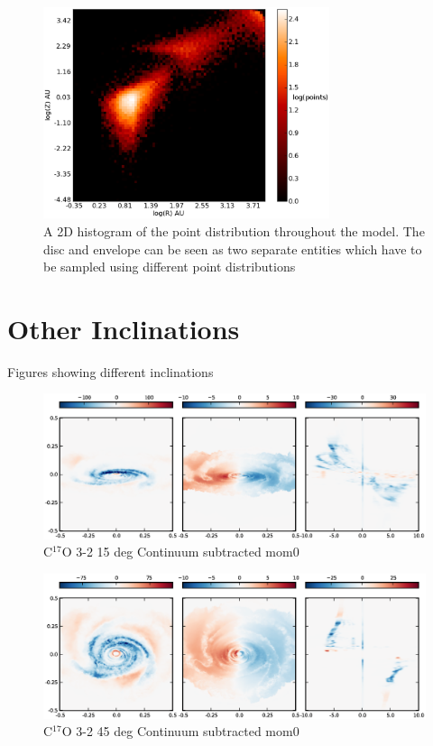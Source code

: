 \documentclass[useAMS,usenatbib]{mn2e}
\begin{document}
\begin{figure}
 \includegraphics[width=84mm]{Figures/model/lime_points_rz_histo2.eps}
 \caption{A 2D histogram of the point distribution throughout the model. The disc and envelope can be seen as two separate entities which have to be sampled using different point distributions}
 \label{points}
\end{figure}




\section{Other Inclinations} \label{sec:other_inc}

Figures showing different inclinations 
\begin{figure}
 \includegraphics[width=198mm]{Figures/sim/imageC17O_3-2_15deg_all.eps}

 \caption{C$^{17}$O 3-2 15 deg Continuum subtracted mom0}
\end{figure}

\begin{figure}
 \includegraphics[width=198mm]{Figures/sim/imageC17O_3-2_45deg_all.eps}

 \caption{C$^{17}$O 3-2 45 deg Continuum subtracted mom0}
\end{figure}
\end{document}
